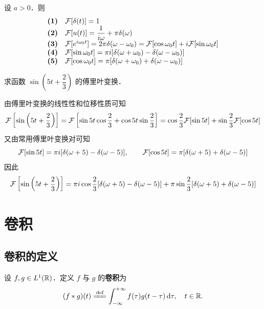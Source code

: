 \documentclass[12pt, a4paper, oneside, UTF8]{ctexbook}
\begin{document}
\begin{theorem}[常用傅里叶变换对]
    设 $a>0$．则
    \[
    \begin{array}{ll}
        \textbf{(1)} & \mathcal{F}[\delta(t)] = 1 \\
        \textbf{(2)} & \displaystyle \mathcal{F}[u(t)]=\frac{1}{i \omega} + \pi \delta(\omega) \\
        \textbf{(3)} & \mathcal{F}[e^{i\omega_0t}]=2\pi\delta(\omega - \omega_0) = \mathcal{F}[\cos \omega_0 t] + i\mathcal{F}[\sin \omega_0 t] \\
        \textbf{(4)} & \mathcal{F}[\sin \omega_0 t]=\pi i[\delta(\omega+\omega_0)-\delta(\omega-\omega_0)] \\
        \textbf{(5)} & \mathcal{F}[\cos \omega_0 t]=\pi[\delta(\omega+\omega_0)+\delta(\omega-\omega_0)] 
    \end{array}
    \]
    
\end{theorem}

\begin{example}
    求函数 $\sin\left(5t+\dfrac23\right)$ 的傅里叶变换．
\end{example}
\begin{solution}
    由傅里叶变换的线性性和位移性质可知
    \[
        \mathcal{F}\left[\sin\left(5t+\frac23\right)\right] = \mathcal{F}\left[\sin 5t\cos\frac23 + \cos 5t\sin\frac23\right] = \cos\frac23\mathcal{F}[\sin 5t] + \sin\frac23\mathcal{F}[\cos 5t]
    \]
    又由常用傅里叶变换对可知
    \[
        \mathcal{F}[\sin 5t] = \pi i[\delta(\omega+5)-\delta(\omega-5)],\qquad
        \mathcal{F}[\cos 5t] = \pi[\delta(\omega+5)+\delta(\omega-5)]
    \]
    因此
    \[
        \mathcal{F}\left[\sin\left(5t+\frac23\right)\right] = \pi i\cos\frac23[\delta(\omega+5)-\delta(\omega-5)] + \pi\sin\frac23[\delta(\omega+5)+\delta(\omega-5)]
    \]
\end{solution}


\section{卷积}

\subsection{卷积的定义}

\begin{definition}[卷积]
设 $f,g\in L^1(\mathbb{R})$．定义 $f$ 与 $g$ 的\textbf{卷积}为
\[
(f*g)(t) \defeq \int_{-\infty}^{+\infty} f(\tau)g(t-\tau)\,\d\tau,\quad t\in\R.
\]
\end{definition}
\end{document}
